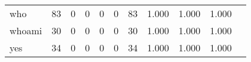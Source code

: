 \begin{longtable}{lp{1.2cm}p{1.2cm}p{1.2cm}p{1.2cm}p{1.2cm}p{1.2cm}p{1.2cm}p{1.2cm}p{1.2cm}p{1.2cm}}
who       &                                    83 &                                                  0 &                                                  0 &                                                  0 &                                                  0 &                                                 83 &                                         1.000 &                                              1.000 &                                              1.000 \\
whoami    &                                    30 &                                                  0 &                                                  0 &                                                  0 &                                                  0 &                                                 30 &                                         1.000 &                                              1.000 &                                              1.000 \\
yes       &                                    34 &                                                  0 &                                                  0 &                                                  0 &                                                  0 &                                                 34 &                                         1.000 &                                              1.000 &                                              1.000 \\
\end{longtable}
